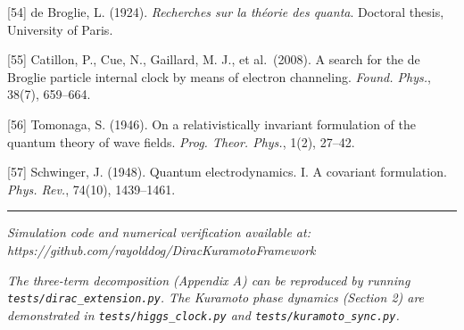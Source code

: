 \documentclass[
]{article}
\begin{document}
{[}54{]} de Broglie, L. (1924). \emph{Recherches sur la théorie des
quanta}. Doctoral thesis, University of Paris.

{[}55{]} Catillon, P., Cue, N., Gaillard, M. J., et al.~(2008). A search
for the de Broglie particle internal clock by means of electron
channeling. \emph{Found. Phys.}, 38(7), 659--664.

{[}56{]} Tomonaga, S. (1946). On a relativistically invariant
formulation of the quantum theory of wave fields. \emph{Prog. Theor.
Phys.}, 1(2), 27--42.

{[}57{]} Schwinger, J. (1948). Quantum electrodynamics. I. A covariant
formulation. \emph{Phys. Rev.}, 74(10), 1439--1461.

\begin{center}\rule{0.5\linewidth}{0.5pt}\end{center}

\emph{Simulation code and numerical verification available at:
https://github.com/rayolddog/DiracKuramotoFramework}

\emph{The three-term decomposition (Appendix A) can be reproduced by
running \texttt{tests/dirac\_extension.py}. The Kuramoto phase dynamics
(Section 2) are demonstrated in \texttt{tests/higgs\_clock.py} and
\texttt{tests/kuramoto\_sync.py}.}
\end{document}

